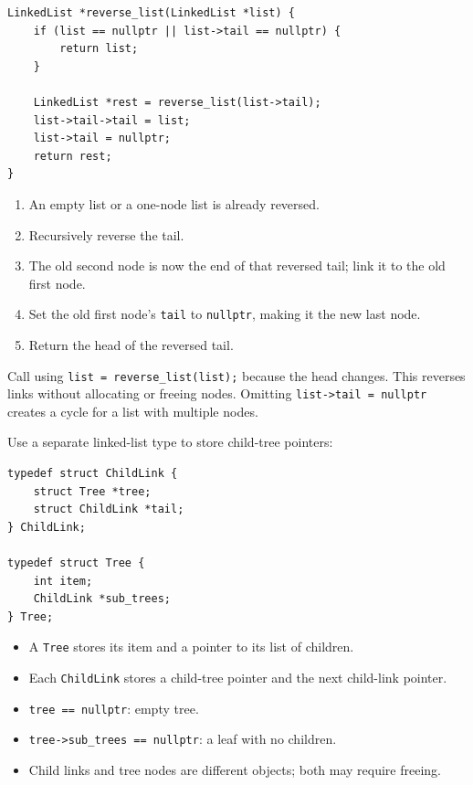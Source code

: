 \documentclass[11pt,a4paper]{article}
\providecommand{\tightlist}{\setlength{\itemsep}{0pt}\setlength{\parskip}{0pt}}
\begin{document}
\begin{lstlisting}[style=cscode]
LinkedList *reverse_list(LinkedList *list) {
    if (list == nullptr || list->tail == nullptr) {
        return list;
    }

    LinkedList *rest = reverse_list(list->tail);
    list->tail->tail = list;
    list->tail = nullptr;
    return rest;
}
\end{lstlisting}

\begin{enumerate}
\def\labelenumi{\arabic{enumi}.}
\tightlist
\item
  An empty list or a one-node list is already reversed.
\item
  Recursively reverse the tail.
\item
  The old second node is now the end of that reversed tail; link it to the old first node.
\item
  Set the old first node's \texttt{tail} to \texttt{nullptr}, making it the new last node.
\item
  Return the head of the reversed tail.
\end{enumerate}

Call using \texttt{list\ =\ reverse\_list(list);} because the head changes. This reverses links without allocating or freeing nodes. Omitting \texttt{list-\textgreater{}tail\ =\ nullptr} creates a cycle for a list with multiple nodes.

\label{trees}
\hypertarget{trees}{}

\label{a-tree-with-a-linked-list-of-children}
\hypertarget{a-tree-with-a-linked-list-of-children}{}

Use a separate linked-list type to store child-tree pointers:

\begin{lstlisting}[style=cscode]
typedef struct ChildLink {
    struct Tree *tree;
    struct ChildLink *tail;
} ChildLink;

typedef struct Tree {
    int item;
    ChildLink *sub_trees;
} Tree;
\end{lstlisting}

\begin{itemize}
\tightlist
\item
  A \texttt{Tree} stores its item and a pointer to its list of children.
\item
  Each \texttt{ChildLink} stores a child-tree pointer and the next child-link pointer.
\item
  \texttt{tree\ ==\ nullptr}: empty tree.
\item
  \texttt{tree-\textgreater{}sub\_trees\ ==\ nullptr}: a leaf with no children.
\item
  Child links and tree nodes are different objects; both may require freeing.
\end{itemize}
\end{document}

